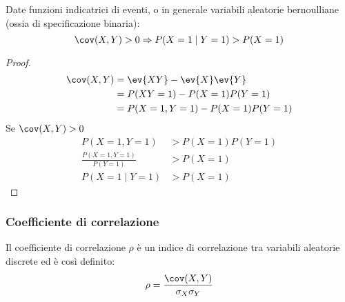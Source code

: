 \begin{prop}
	Date funzioni indicatrici di eventi, o in generale variabili aleatorie bernoulliane (ossia di specificazione binaria):
	\begin{equation*}
		\cov(X,Y)>0 \Rightarrow P(X=1\mid Y=1)>P(X=1)
	\end{equation*}
\end{prop}
\begin{proof}
	\begin{align*}
		\cov(X,Y) & = \ev{XY} - \ev{X}\ev{Y}  \\
		          & = P(XY=1)-P(X=1)P(Y=1)    \\
		          & = P(X=1,Y=1)-P(X=1)P(Y=1) \\
	\end{align*}
	Se $\cov(X,Y)>0$
	\begin{align*}
		P(X=1,Y=1)                & > P(X=1)P(Y=1) \\
		\frac{P(X=1,Y=1)}{P(Y=1)} & > P(X=1)       \\
		P(X=1\mid Y=1)            & > P(X=1)
	\end{align*}
\end{proof}


\subsubsection{Coefficiente di correlazione}
\begin{defin}
	Il coefficiente di correlazione $\rho$ è un indice di correlazione tra variabili aleatorie discrete ed è così definito:
	\begin{equation*}
		\rho= \frac{\cov(X,Y)}{\sigma_X\sigma_Y}
	\end{equation*}
\end{defin}
